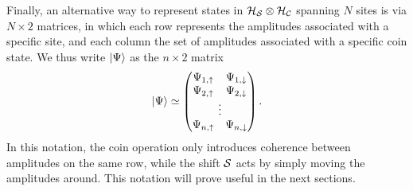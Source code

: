 Finally, an alternative way to represent states in ${{\mathcal{H}}_{\mathcal{S}}}\otimes{{\mathcal{H}}_{\mathcal{C}}}$ spanning $N$ sites is via $N\times 2$ matrices, in which each row represents the amplitudes associated with a specific site, and each column the set of amplitudes associated with a specific coin state. 
We thus write $\ket\Psi$ as the $n\times2$ matrix
\begin{equation}
    \ket\Psi\simeq \begin{pmatrix}
        \Psi_{1,\uparrow} & \Psi_{1,\downarrow} \\
        \Psi_{2,\uparrow} & \Psi_{2,\downarrow} \\
        \multicolumn{2}{c}{\vdots} \\ 
        \Psi_{n,\uparrow} & \Psi_{n,\downarrow} \\
    \end{pmatrix}.
    \label{eq:qw_matrix_notation}
\end{equation}
In this notation, the coin operation only introduces coherence between amplitudes on the same row, while the shift ${\mathcal{S}}$ acts by simply moving the amplitudes around.
This notation will prove useful in the next sections.


